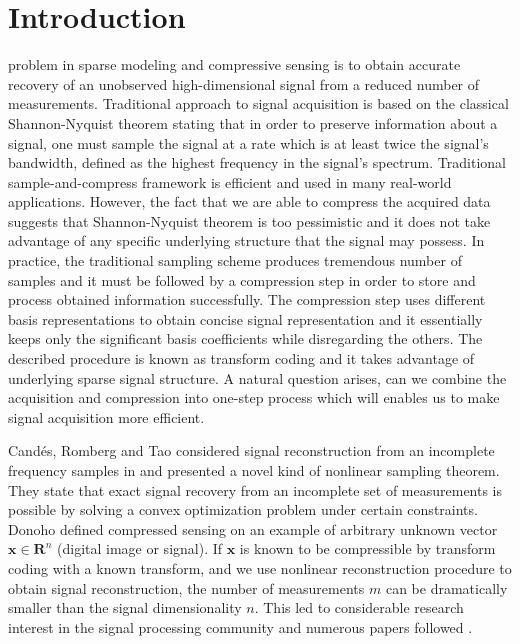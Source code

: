 \documentclass[journal]{IEEEtran}
\begin{document}
\section{Introduction}
% 
% 
% 
% 
 problem in sparse modeling and compressive sensing is to obtain accurate recovery of an unobserved high-dimensional signal from a reduced number of measurements. Traditional approach to signal acquisition is based on the classical Shannon-Nyquist theorem \cite{shannon1949, nyquist1928certain} stating that in order to preserve information about a signal, one must sample the signal at a rate which is at least twice the signal's bandwidth, defined as the highest frequency in the signal's spectrum. Traditional sample-and-compress framework is efficient and used in many real-world applications. However, the fact that we are able to compress the acquired data suggests that Shannon-Nyquist theorem is too pessimistic and it does not take advantage of any specific underlying structure that the signal may possess. In practice, the traditional sampling scheme produces tremendous number of samples and it must be followed by a compression step in order to store and process obtained information successfully. The compression step uses different basis representations to obtain concise signal representation and it essentially keeps only the significant basis coefficients while disregarding the others. The described procedure is known as transform coding and it takes advantage of underlying sparse signal structure. A natural question arises, can we combine the acquisition and compression into one-step process which will enables us to make signal acquisition more efficient. 

Cand\'es, Romberg and Tao considered signal reconstruction from an incomplete frequency samples in \cite{Candes2006} and presented a novel kind of nonlinear sampling theorem. They state that exact signal recovery from an incomplete set of measurements is possible by solving a convex optimization problem under certain constraints. Donoho \cite{Donoho2006} defined compressed sensing on an example of arbitrary unknown vector $\boldsymbol{x} \in \mathbf{R}^n$ (digital image or signal). If $\boldsymbol{x}$ is known to be compressible by transform coding with a known transform, and we use nonlinear reconstruction procedure to obtain signal reconstruction, the number of measurements $m$ can be dramatically smaller than the signal dimensionality $n$. This led to considerable research interest in the signal processing community and numerous papers followed \cite{Candes2006_2, Candes2007, Baraniuk2007, Candes2008}.
\end{document}
